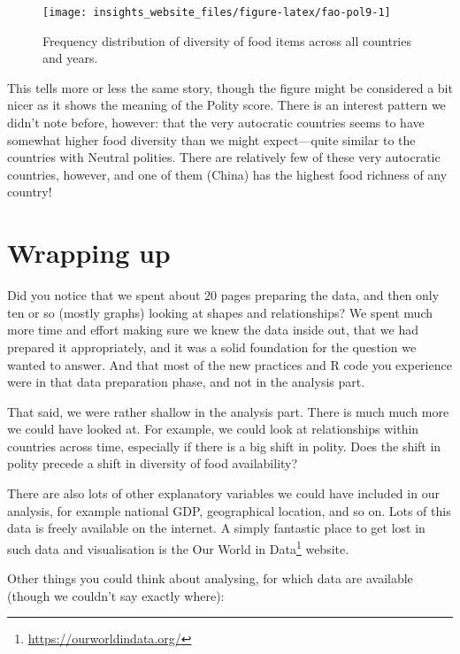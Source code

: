 \documentclass[]{book}
\renewcommand{\href}[2]{#2\footnote{\url{#1}}}
\begin{document}
\begin{figure}

{\centering \texttt{[image: insights\_website\_files/figure-latex/fao-pol9-1]} 

}

\caption{Frequency distribution of diversity of food items across all countries and years.}\label{fig:fao-pol9}
\end{figure}

This tells more or less the same story, though the figure might be considered a bit nicer as it shows the meaning of the Polity score. There is an interest pattern we didn't note before, however: that the very autocratic countries seems to have somewhat higher food diversity than we might expect---quite similar to the countries with Neutral polities. There are relatively few of these very autocratic countries, however, and one of them (China) has the highest food richness of any country!

\hypertarget{wrapping-up}{%
\section{Wrapping up}\label{wrapping-up}}

Did you notice that we spent about 20 pages preparing the data, and then only ten or so (mostly graphs) looking at shapes and relationships? We spent much more time and effort making sure we knew the data inside out, that we had prepared it appropriately, and it was a solid foundation for the question we wanted to answer. And that most of the new practices and R code you experience were in that data preparation phase, and not in the analysis part.

That said, we were rather shallow in the analysis part. There is much much more we could have looked at. For example, we could look at relationships within countries across time, especially if there is a big shift in polity. Does the shift in polity precede a shift in diversity of food availability?

There are also lots of other explanatory variables we could have included in our analysis, for example national GDP, geographical location, and so on. Lots of this data is freely available on the internet. A simply fantastic place to get lost in such data and visualisation is the \href{https://ourworldindata.org/}{Our World in Data} website.

Other things you could think about analysing, for which data are available (though we couldn't say exactly where):
\end{document}
